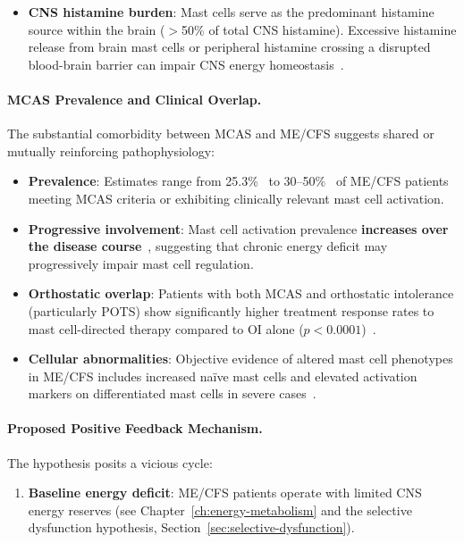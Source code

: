 \begin{speculation}
\begin{itemize}
    \item \textbf{CNS histamine burden}: Mast cells serve as the predominant histamine source within the brain ($>$50\% of total CNS histamine). Excessive histamine release from brain mast cells or peripheral histamine crossing a disrupted blood-brain barrier can impair CNS energy homeostasis~\cite{Zhang2024MastBrain}.
\end{itemize}

\paragraph{MCAS Prevalence and Clinical Overlap.}

The substantial comorbidity between MCAS and ME/CFS suggests shared or mutually reinforcing pathophysiology:

\begin{itemize}
    \item \textbf{Prevalence}: Estimates range from 25.3\%~\cite{Frioni2025MCAS} to 30--50\%~\cite{Wirth2023} of ME/CFS patients meeting MCAS criteria or exhibiting clinically relevant mast cell activation.

    \item \textbf{Progressive involvement}: Mast cell activation prevalence \textbf{increases over the disease course}~\cite{Frioni2025MCAS}, suggesting that chronic energy deficit may progressively impair mast cell regulation.

    \item \textbf{Orthostatic overlap}: Patients with both MCAS and orthostatic intolerance (particularly POTS) show significantly higher treatment response rates to mast cell-directed therapy compared to OI alone ($p<0.0001$)~\cite{Wirth2023,Frioni2025MCAS}.

    \item \textbf{Cellular abnormalities}: Objective evidence of altered mast cell phenotypes in ME/CFS includes increased na\"ive mast cells and elevated activation markers on differentiated mast cells in severe cases~\cite{Hardcastle2016}.
\end{itemize}

\paragraph{Proposed Positive Feedback Mechanism.}

The hypothesis posits a vicious cycle:

\begin{enumerate}
    \item \textbf{Baseline energy deficit}: ME/CFS patients operate with limited CNS energy reserves (see Chapter~\ref{ch:energy-metabolism} and the selective dysfunction hypothesis, Section~\ref{sec:selective-dysfunction}).


\end{enumerate}
\end{speculation}
